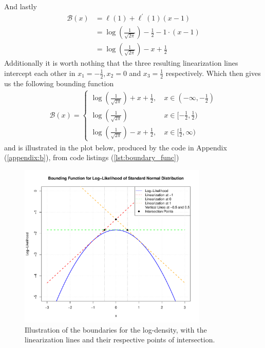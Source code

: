 And lastly 
\begin{align}
    \mathcal{B}(x) &= \ell(1) + \ell^{\prime}(1)(x - 1) \\[5pt]
        &= \log \left( \frac{1}{\sqrt{2 \pi}} \right) - \frac{1}{2} - 1 \cdot(x - 1) \\[5pt]
        &= \log \left( \frac{1}{\sqrt{2 \pi}} \right) - x + \frac{1}{2}
\end{align}
Additionally it is worth nothing that the three resulting linearization lines intercept each other in $x_1 = -\frac{1}{2}, x_2 = 0$ and $x_3 = \frac{1}{2}$ respectively. Which then gives us the following bounding function 
\begin{align}
    \mathcal{B}(x) = \begin{cases}
        \log \left( \frac{1}{\sqrt{2 \pi}} \right) + x + \frac{1}{2}, \ &x \in (-\infty, -\frac{1}{2}) \\[5pt]
        \log \left( \frac{1}{\sqrt{2 \pi}} \right) \ &x \in [-\frac{1}{2}, \frac{1}{2}) \\[5pt]
        \log \left( \frac{1}{\sqrt{2 \pi}} \right) - x + \frac{1}{2}, \ &x \in [\frac{1}{2}, \infty)
    \end{cases}
\end{align}
and is illustrated in the plot below, produced by the code in Appendix (\ref{appendix:b}), from code listings (\ref{lst:boundary_func})
\begin{figure}[H]
    \centering
    \includegraphics[width=0.8\textwidth]{Images/Exercise_1_Figures/Boundary_func.pdf} 
    \caption{Illustration of the boundaries for the log-density, with the linearization lines and their respective points of intersection.}
    \label{fig:example}
\end{figure}

